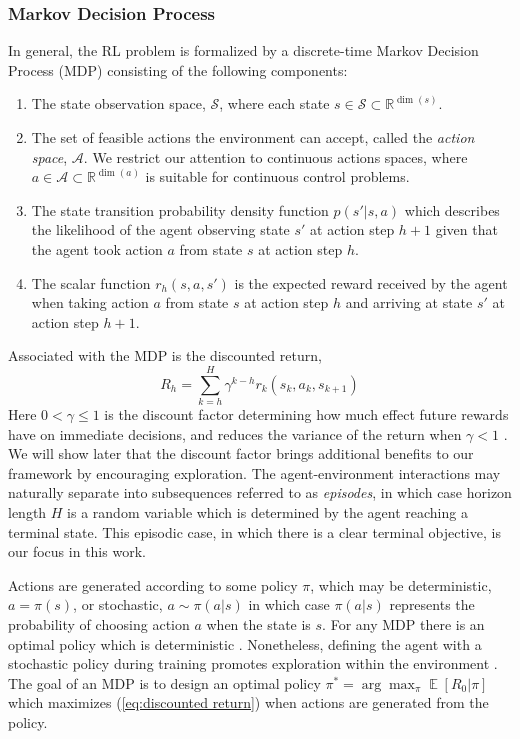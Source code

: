 \documentclass{UnderReview}
\DeclareMathOperator*{\E}{\mathbb{E}}
\begin{document}
\subsubsection{Markov Decision Process}
In general, the RL problem is formalized by a discrete-time Markov Decision Process (MDP) consisting of the following components:
\begin{enumerate}
	\item The state observation space, $\mathcal{S}$, where each state $s\in \mathcal{S}\subset \mathbb{R}^{\dim(s)}$.  
	\item The set of feasible actions the environment can accept, called the \textit{action space}, $\mathcal{A}$.  We restrict our attention to continuous actions spaces, where $a\in\mathcal{A} \subset \mathbb{R}^{\dim(a)}$ is suitable for continuous control problems.  
	\item The state transition probability density function $p(s'|s,a)$ which describes the likelihood of the agent observing state $s'$ at action step $h+1$ given that the agent took action $a$ from state $s$ at action step $h$.
	\item The scalar function $r_h(s,a,s')$ is the expected reward received by the agent when taking action $a$ from state $s$ at action step $h$ and arriving at state $s'$ at action step $h+1$.  
\end{enumerate}
Associated with the MDP is the discounted return,
\begin{equation}\label{eq:discounted return}
	R_h = \sum_{k=h}^{H} \gamma^{k-h}r_{k}(s_k, a_k, s_{k+1})
\end{equation}  
Here $0 < \gamma \leq 1$ is the discount factor determining how much effect future rewards have on immediate decisions, and reduces the variance of the return when $\gamma < 1$ \cite{schulman2015high}.  We will show later that the discount factor brings additional benefits to our framework by encouraging exploration.  The agent-environment interactions may naturally separate into subsequences referred to as \textit{episodes}, in which case horizon length $H$ is a random variable which is determined by the agent reaching a terminal state.  This episodic case, in which there is a clear terminal objective, is our focus in this work. 

Actions are generated according to some policy $\pi$, which may be deterministic, $a = \pi(s)$, or stochastic, $a \sim \pi(a|s)$ in which case $\pi(a|s)$ represents the probability of choosing action $a$ when the state is $s$.  For any MDP there is an optimal policy which is deterministic \cite{littman1994markov}.  Nonetheless, defining the agent with a stochastic policy during training promotes exploration within the environment \cite{sutton2018reinforcement}.  The goal of an MDP is to design an optimal policy $\pi^* = \arg\max_\pi \E \left[ R_0 | \pi \right]$ which maximizes (\ref{eq:discounted return}) when actions are generated from the policy.   
\end{document}
